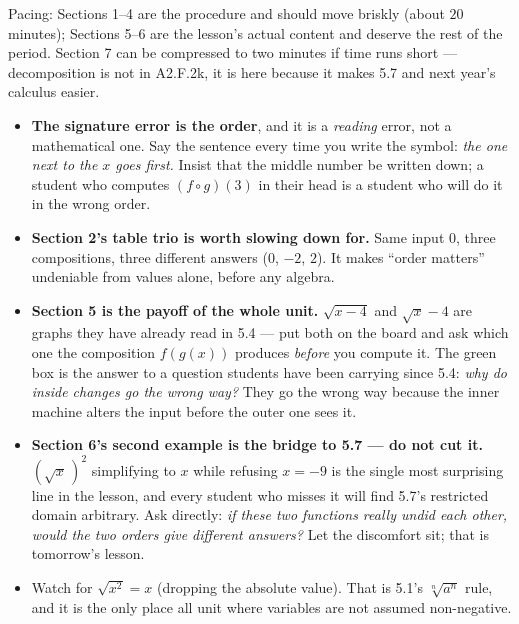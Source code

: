 \documentclass[10pt]{article}
\begin{document}
\begin{teachernote}
\small Pacing: Sections 1--4 are the procedure and should move briskly (about $20$ minutes);
Sections 5--6 are the lesson's actual content and deserve the rest of the period. Section 7 can be
compressed to two minutes if time runs short --- decomposition is not in A2.F.2k, it is here because
it makes 5.7 and next year's calculus easier.
\begin{itemize}[leftmargin=1.3em, nosep]
  \item \textbf{The signature error is the order}, and it is a \emph{reading} error, not a
        mathematical one. Say the sentence every time you write the symbol: \emph{the one next to
        the $x$ goes first.} Insist that the middle number be written down; a student who computes
        $(f\circ g)(3)$ in their head is a student who will do it in the wrong order.
  \item \textbf{Section 2's table trio is worth slowing down for.} Same input $0$, three
        compositions, three different answers ($0$, $-2$, $2$). It makes ``order matters''
        undeniable from values alone, before any algebra.
  \item \textbf{Section 5 is the payoff of the whole unit.} $\sqrt{x-4}$ and $\sqrt{x}-4$ are graphs
        they have already read in 5.4 --- put both on the board and ask which one the composition
        $f(g(x))$ produces \emph{before} you compute it. The green box is the answer to a question
        students have been carrying since 5.4: \emph{why do inside changes go the wrong way?} They go
        the wrong way because the inner machine alters the input before the outer one sees it.
  \item \textbf{Section 6's second example is the bridge to 5.7 --- do not cut it.}
        $\left(\sqrt{x}\,\right)^{2}$ simplifying to $x$ while refusing $x=-9$ is the single most
        surprising line in the lesson, and every student who misses it will find 5.7's restricted
        domain arbitrary. Ask directly: \emph{if these two functions really undid each other, would
        the two orders give different answers?} Let the discomfort sit; that is tomorrow's lesson.
  \item Watch for $\sqrt{x^{2}}=x$ (dropping the absolute value). That is 5.1's
        $\sqrt[n]{a^{n}}$ rule, and it is the only place all unit where variables are not assumed
        non-negative.
\end{itemize}
\end{teachernote}
\end{document}
